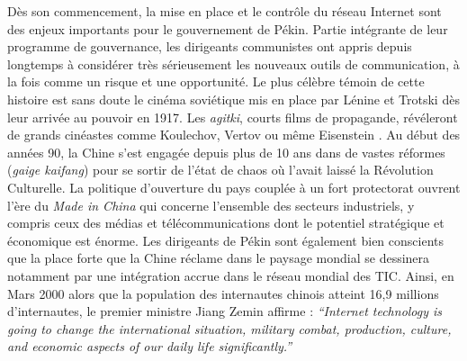 Dès son commencement, la mise en place et le contrôle du réseau Internet sont des enjeux importants pour le gouvernement de Pékin. Partie intégrante de leur programme de gouvernance, les dirigeants communistes ont appris depuis longtemps à considérer très sérieusement les nouveaux outils de communication, à la fois comme un risque et une opportunité. Le plus célèbre témoin de cette histoire est sans doute le cinéma soviétique mis en place par Lénine et Trotski dès leur arrivée au pouvoir en 1917. Les \textit{agitki}, courts films de propagande, révéleront de grands cinéastes comme Koulechov, Vertov ou même Eisenstein \citep{Mazuy2002}. Au début des années 90, la Chine s’est engagée depuis plus de 10 ans dans de vastes réformes (\textit{gaige kaifang}) pour se sortir de l’état de chaos où l’avait laissé la Révolution Culturelle. La politique d’ouverture du pays couplée à un fort protectorat ouvrent l’ère du \textit{Made in China} qui concerne l’ensemble des secteurs industriels, y compris ceux des médias et télécommunications dont le potentiel stratégique et économique est énorme. Les dirigeants de Pékin sont également bien conscients que la place forte que la Chine réclame dans le paysage mondial se dessinera notamment par une intégration accrue dans le réseau mondial des TIC. Ainsi, en Mars 2000 alors que la population des internautes chinois atteint 16,9 millions d’internautes, le premier ministre Jiang Zemin affirme : \textit{“Internet technology is going to change the international situation, military combat, production, culture, and economic aspects of our daily life significantly.”} \citep{Foster2000}

